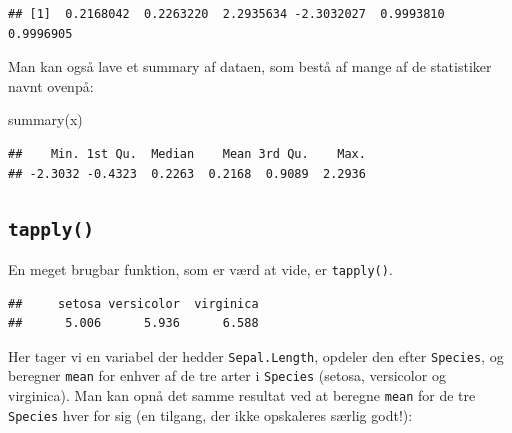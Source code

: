 \documentclass[
]{book}
\newenvironment{Shaded}{\begin{snugshade}}{\end{snugshade}}
\newcommand{\CommentTok}[1]{\textcolor[rgb]{0.56,0.35,0.01}{\textit{#1}}}
\newcommand{\FunctionTok}[1]{\textcolor[rgb]{0.00,0.00,0.00}{#1}}
\newcommand{\NormalTok}[1]{#1}
\newcommand{\SpecialCharTok}[1]{\textcolor[rgb]{0.00,0.00,0.00}{#1}}
\begin{document}
\begin{verbatim}
## [1]  0.2168042  0.2263220  2.2935634 -2.3032027  0.9993810  0.9996905
\end{verbatim}

Man kan også lave et summary af dataen, som bestå af mange af de statistiker navnt ovenpå:

\begin{Shaded}
\begin{Highlighting}[]
\FunctionTok{summary}\NormalTok{(x)}
\end{Highlighting}
\end{Shaded}

\begin{verbatim}
##    Min. 1st Qu.  Median    Mean 3rd Qu.    Max. 
## -2.3032 -0.4323  0.2263  0.2168  0.9089  2.2936
\end{verbatim}

\hypertarget{tapply}{%
\subsection{\texorpdfstring{\texttt{tapply()}}{tapply()}}\label{tapply}}

En meget brugbar funktion, som er værd at vide, er \texttt{tapply()}.

\begin{Shaded}
\end{Shaded}

\begin{verbatim}
##     setosa versicolor  virginica 
##      5.006      5.936      6.588
\end{verbatim}

Her tager vi en variabel der hedder \texttt{Sepal.Length}, opdeler den efter \texttt{Species}, og beregner \texttt{mean} for enhver af de tre arter i \texttt{Species} (setosa, versicolor og virginica). Man kan opnå det samme resultat ved at beregne \texttt{mean} for de tre \texttt{Species} hver for sig (en tilgang, der ikke opskaleres særlig godt!):
\end{document}
